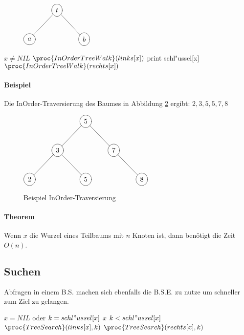 \documentclass[a4paper,twoside,DIV15,BCOR12mm]{scrbook}
\begin{document}
\begin{figure}[htb]
	\centering
	$\begin{xy}
		\entrymodifiers={++[o][F-]}
		\xymatrix {
	  	*{} & t \ar@{-}[rd]\ar@{-}[ld] & *{} \\
	  	a & *{} & b\\
		}
	\end{xy}$
	\label{tree1}
\end{figure}

\begin{codebox}
\li \If $x \neq NIL$
\li		\Then $\proc{InOrderTreeWalk}(links[x])$
		\End
\li	print schl"ussel[x]
\li $\proc{InOrderTreeWalk}(rechts[x])$
\end{codebox}

\paragraph{Beispiel}
Die InOrder-Traversierung des Baumes in Abbildung \ref{tree3} ergibt: $2,3,5,5,7,8$
\begin{figure}[htb]
	\centering
	$\begin{xy}
		\entrymodifiers={++[o][F-]}
		\xymatrix {
	  	*{} & *{}  & 5 \ar@{-}[rd]\ar@{-}[ld] & *{} & *{} \\
	  	*{} & 3 \ar@{-}[rd]\ar@{-}[ld]& *{} & 7 \ar@{-}[rd] & *{} \\
	  	2 & *{} & 5 & *{} & 8 \\
		}
	\end{xy}$
	\caption{Beispiel InOrder-Traversierung}
	\label{tree3}
\end{figure}

\paragraph{Theorem}

Wenn $x$ die Wurzel eines Teilbaums mit $n$ Knoten ist, dann benötigt 
 die Zeit $O(n)$.

\subsection{Suchen}
Abfragen in einem B.S. machen sich ebenfalls die B.S.E. zu nutze um schneller zum Ziel zu gelangen.
\begin{codebox}
\li \If $x = NIL$ oder $k=schl"ussel[x]$
\li 	\Then \Return $x$
		\End
\li	\If $k < schl"ussel[x]$
\li 	\Then \Return $\proc{TreeSearch}(links[x], k)$
\li		\Else \Return $\proc{TreeSearch}(rechts[x], k)$
		\End
\end{codebox}
\end{document}
